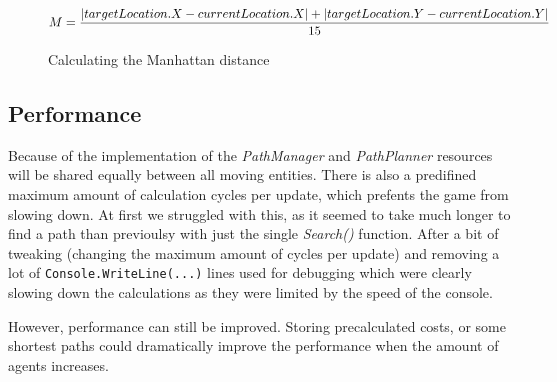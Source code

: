 \begin{figure}[h!]
    \[ $$M = \dfrac{|targetLocation.X - currentLocation.X| + |targetLocation.Y - currentLocation.Y|}{15}\]
    \caption{Calculating the Manhattan distance}
    \label{fig:pathPlanCalcManhattan}
\end{figure}

\subsection{Performance}\label{subsec:pathperformance}
Because of the implementation of the \textit{PathManager} and \textit{PathPlanner} resources will be shared equally between all moving entities.
There is also a predifined maximum amount of calculation cycles per update, which prefents the game from slowing down.
At first we struggled with this, as it seemed to take much longer to find a path than previoulsy with just the single \textit{Search()} function.
After a bit of tweaking (changing the maximum amount of cycles per update) and removing a lot of \lstinline[columns=fixed]{Console.WriteLine(...)}
lines used for debugging which were clearly slowing down the calculations as they were limited by the speed of the console.\par
However, performance can still be improved.
Storing precalculated costs, or some shortest paths could dramatically improve the performance when the amount of agents increases.
\newpage
